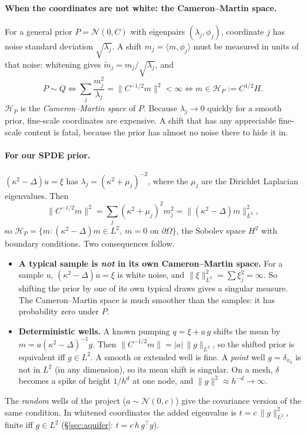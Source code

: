 \documentclass[11pt]{article}
\theoremstyle{definition}
\theoremstyle{remark}
\newcommand{\N}{\mathcal N}
\begin{document}
\paragraph{When the coordinates are not white: the Cameron--Martin space.}
For a general prior $P=\N(0,C)$ with eigenpairs $(\lambda_j,\phi_j)$, coordinate $j$ has noise standard
deviation $\sqrt{\lambda_j}$. A shift $m_j=\langle m,\phi_j\rangle$ must be measured in units of that
noise: whitening gives $\tilde m_j=m_j/\sqrt{\lambda_j}$, and
\[
P\sim Q\iff \sum_j\frac{m_j^2}{\lambda_j}=\|C^{-1/2}m\|^2<\infty
\iff m\in\mathcal H_P:=C^{1/2}H .
\]
$\mathcal H_P$ is the \emph{Cameron--Martin space} of $P$. Because $\lambda_j\to0$ quickly for a smooth
prior, fine-scale coordinates are expensive. A shift that has any appreciable fine-scale content is
fatal, because the prior has almost no noise there to hide it in.

\paragraph{For our SPDE prior.} $(\kappa^2-\Delta)u=\xi$ has $\lambda_j=(\kappa^2+\mu_j)^{-2}$, where the
$\mu_j$ are the Dirichlet Laplacian eigenvalues. Then
\[
\|C^{-1/2}m\|^2=\sum_j(\kappa^2+\mu_j)^2m_j^2=\|(\kappa^2-\Delta)m\|_{L^2}^2 ,
\]
so $\mathcal H_P=\{m:(\kappa^2-\Delta)m\in L^2,\ m=0\text{ on }\partial\Omega\}$, the Sobolev space
$H^2$ with boundary conditions. Two consequences follow.
\begin{itemize}
\item \textbf{A typical sample is \emph{not} in its own Cameron--Martin space.} For a sample $u$,
$(\kappa^2-\Delta)u=\xi$ is white noise, and $\|\xi\|_{L^2}^2=\sum\xi_j^2=\infty$. So shifting the prior by
one of its own typical draws gives a singular measure. The Cameron--Martin space is much smoother
than the samples: it has probability zero under $P$.
\item \textbf{Deterministic wells.} A known pumping $q=\xi+a\,g$ shifts the mean by $m=a(\kappa^2-\Delta)^{-1}g$.
Then $\|C^{-1/2}m\|=|a|\,\|g\|_{L^2}$, so the shifted prior is equivalent iff $g\in L^2$. A smooth or
extended well is fine. A \emph{point} well $g=\delta_{x_0}$ is not in $L^2$ (in any dimension), so its
mean shift is singular. On a mesh, $\delta$ becomes a spike of height $1/h^d$ at one node, and
$\|g\|^2\approx h^{-d}\to\infty$.
\end{itemize}
The \emph{random} wells of the project ($a\sim\N(0,c)$) give the covariance version of the same
condition. In whitened coordinates the added eigenvalue is $t=c\,\|g\|_{L^2}^2$, finite iff
$g\in L^2$ (\S\ref{sec:aquifer}: $t=c\,h\,g^\top g$).
\end{document}
